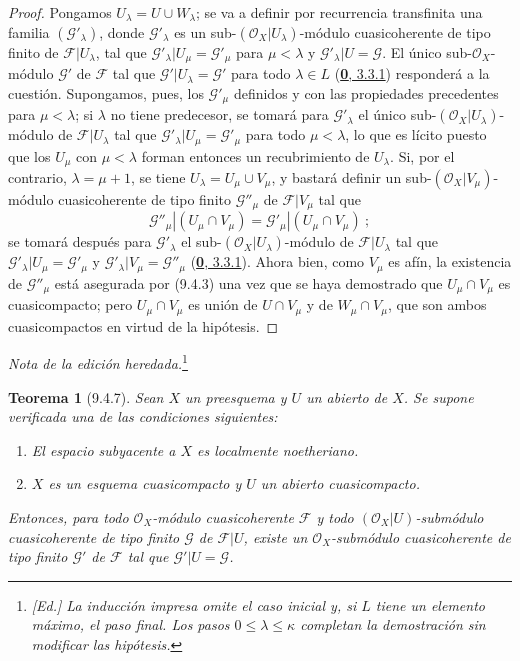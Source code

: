 \documentclass[oneside]{amsart}
\theoremstyle{ega-env-style}
\theoremstyle{ega-thm-env-style}
\newtheorem*{theorem}{Teorema}
\theoremstyle{ega-defn-env-style}
\def\leq{\leqslant}                 %
\let\EGAOriginalLabel\label
\renewcommand{\label}[1]{\phantomsection\EGAOriginalLabel{#1}}
\begin{document}
\begin{proof}
Pongamos $U_\lambda=U\cup W_\lambda$; se va a definir por recurrencia transfinita
una familia $(\mathscr{G}'_\lambda)$, donde $\mathscr{G}'_\lambda$ es un
sub-$(\mathscr{O}_X|U_\lambda)$-módulo cuasicoherente de tipo finito de
$\mathscr{F}|U_\lambda$, tal que
$\mathscr{G}'_\lambda|U_\mu=\mathscr{G}'_\mu$ para $\mu<\lambda$ y
$\mathscr{G}'_\lambda|U=\mathscr{G}$. El único sub-$\mathscr{O}_X$-módulo
$\mathscr{G}'$ de $\mathscr{F}$ tal que
$\mathscr{G}'|U_\lambda=\mathscr{G}'$ para todo $\lambda\in L$
(\hyperref[0.3.3.1-fr]{\textbf{0}, 3.3.1}) responderá a la cuestión. Supongamos, pues, los
$\mathscr{G}'_\mu$ definidos y con las propiedades precedentes para
$\mu<\lambda$; si $\lambda$ no tiene predecesor, se tomará para
$\mathscr{G}'_\lambda$ el único sub-$(\mathscr{O}_X|U_\lambda)$-módulo de
$\mathscr{F}|U_\lambda$ tal que
$\mathscr{G}'_\lambda|U_\mu=\mathscr{G}'_\mu$ para todo $\mu<\lambda$, lo
que es lícito puesto que los $U_\mu$ con $\mu<\lambda$ forman entonces un
recubrimiento de $U_\lambda$. Si, por el contrario, $\lambda=\mu+1$, se tiene
$U_\lambda=U_\mu\cup V_\mu$, y bastará definir un
sub-$(\mathscr{O}_X|V_\mu)$-módulo cuasicoherente de tipo finito
$\mathscr{G}''_\mu$ de $\mathscr{F}|V_\mu$ tal que
\[
  \mathscr{G}''_\mu|(U_\mu\cap V_\mu)
  =\mathscr{G}'_\mu|(U_\mu\cap V_\mu)~;
\]
se tomará después para $\mathscr{G}'_\lambda$ el
sub-$(\mathscr{O}_X|U_\lambda)$-módulo de $\mathscr{F}|U_\lambda$ tal que
$\mathscr{G}'_\lambda|U_\mu=\mathscr{G}'_\mu$ y
$\mathscr{G}'_\lambda|V_\mu=\mathscr{G}''_\mu$
(\hyperref[0.3.3.1-fr]{\textbf{0}, 3.3.1}). Ahora bien, como $V_\mu$ es afín, la existencia
de $\mathscr{G}''_\mu$ está asegurada por (9.4.3) una vez que se haya demostrado que
$U_\mu\cap V_\mu$ es cuasicompacto; pero $U_\mu\cap V_\mu$ es unión de
$U\cap V_\mu$ y de $W_\mu\cap V_\mu$, que son ambos cuasicompactos en
virtud de la hipótesis.
\end{proof}


\par\noindent\textit{Nota de la edición heredada.}\footnote{\emph{[Ed.] La inducción impresa omite el caso inicial y, si $L$ tiene un elemento máximo, el paso final. Los pasos $0\leq\lambda\leq\kappa$ completan la demostración sin modificar las hipótesis.}}\par
\begin{theorem}[9.4.7]
\label{I.9.4.7}
Sean $X$ un preesquema y $U$ un abierto de $X$. Se supone verificada una de las
condiciones siguientes:
\begin{enumerate}
  \item[\textup{a)}] El espacio subyacente a $X$ es localmente noetheriano.
  \item[\textup{b)}] $X$ es un esquema cuasicompacto y $U$ un abierto cuasicompacto.
\end{enumerate}
Entonces, para todo $\mathscr{O}_X$-módulo cuasicoherente $\mathscr{F}$ y todo
$(\mathscr{O}_X|U)$-submódulo cuasicoherente \textup{de tipo finito} $\mathscr{G}$ de $\mathscr{F}|U$, existe
un $\mathscr{O}_X$-submódulo cuasicoherente \textup{de tipo finito} $\mathscr{G}'$ de $\mathscr{F}$ tal que
$\mathscr{G}'|U=\mathscr{G}$.
\end{theorem}
\end{document}
